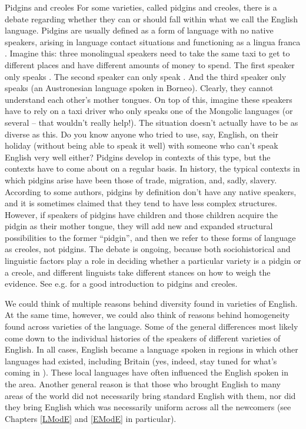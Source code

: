 \begin{varietybox}{Pidgins and creoles}
\label{pidgincreole}
For some varieties, called pidgins and creoles, there is a debate regarding whether they can or should fall within what we call the English language. Pidgins are usually defined as a form of language with no native speakers, arising in language contact situations and functioning as a lingua franca \citep[103]{Trudgill2003}. Imagine this: three monolingual speakers need to take the same taxi to get to different places and have different amounts of money to spend. The first speaker only speaks . The second speaker can only speak . And the third speaker only speaks  (an Austronesian language spoken in Borneo). Clearly, they cannot understand each other's mother tongues. On top of this, imagine these speakers have to rely on a taxi driver who only speaks one of the Mongolic languages (or several -- that wouldn't really help!). The situation doesn't actually have to be as diverse as this. Do you know anyone who tried to use, say, English, on their holiday (without being able to speak it well) with someone who can't speak English very well either? Pidgins develop in contexts of this type, but the contexts have to come about on a regular basis. In history, the typical contexts in which pidgins arise have been those of trade, migration, and, sadly, slavery. According to some authors, pidgins by definition don't have any native speakers, and it is sometimes claimed that they tend to have less complex structures. However, if speakers of pidgins have children and those children acquire the pidgin as their mother tongue, they will add new and expanded structural possibilities to the former ``pidgin'', and then we refer to these forms of language as creoles, not pidgins. The debate is ongoing, because both sociohistorical and linguistic factors play a role in deciding whether a particular variety is a pidgin or a creole, and different linguists take different stances on how to weigh the evidence. See e.g. \citet{Velupillai2015} for a good introduction to pidgins and creoles.
\end{varietybox}
\newpage

\noindent We could think of multiple reasons behind diversity found in varieties of English. At the same time, however, we could also think of reasons behind homogeneity found across varieties of the language. Some of the general differences most likely come down to the individual histories of the speakers of different varieties of English. In all cases, English became a language spoken in regions in which other languages had existed, including Britain (yes, indeed, stay tuned for what's coming in ). These local languages have often influenced the English spoken in the area. Another general reason is that those who brought English to many areas of the world did not necessarily bring standard English with them, nor did they bring English which was necessarily uniform across all the newcomers (see Chapters \ref{LModE} and \ref{EModE} in particular).

